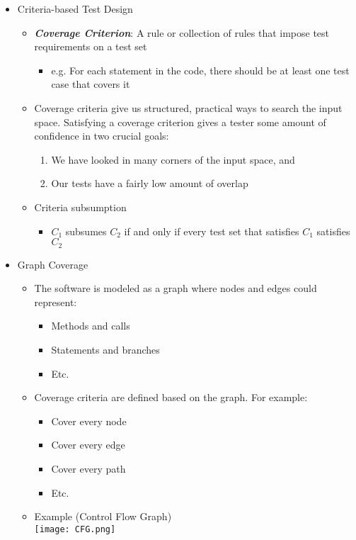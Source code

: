 \begin{itemize}
	\item Criteria-based Test Design
	\begin{itemize}
		\item \textbf{\textit{Coverage Criterion}}: A rule or collection of rules that impose test requirements on a test set
		\begin{itemize}
			\item e.g. For each statement in the code, there should be at least one test case that covers it
		\end{itemize}
		\item Coverage criteria give us structured, practical ways to search the input space. Satisfying a coverage criterion gives a tester some amount of confidence in two crucial goals:
		\begin{enumerate}
			\item We have looked in many corners of the input space, and
			\item Our tests have a fairly low amount of overlap
		\end{enumerate}
		\item Criteria subsumption
		\begin{itemize}
			\item $ C_1 $ subsumes $ C_2 $ if and only if every test set that satisfies $ C_1 $ satisfies $ C_2 $
		\end{itemize}
	\end{itemize}

	\item Graph Coverage
	\begin{itemize}
		\item The software is modeled as a graph where nodes and edges could represent:
		\begin{itemize}
			\item Methods and calls
			\item Statements and branches
			\item Etc.
		\end{itemize}
		\item Coverage criteria are defined based on the graph. For example:
		\begin{itemize}
			\item Cover every node
			\item Cover every edge
			\item Cover every path
			\item Etc.
		\end{itemize}


		\item Example (Control Flow Graph)\\
		\texttt{[image: CFG.png]}
	\end{itemize}


\end{itemize}
